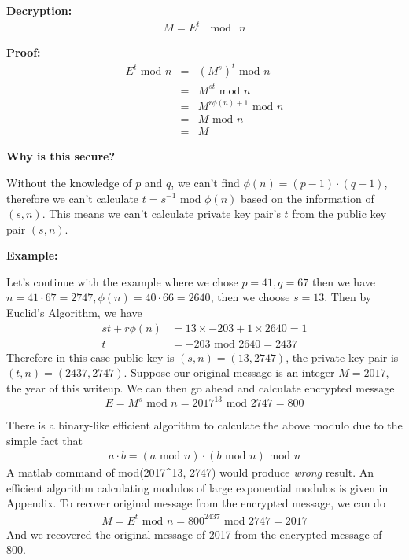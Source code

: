 \documentclass[]{paper}
\begin{document}
\textbf{Decryption:}
\begin{eqnarray*}
M = E^t\ \mod\ n 
\end{eqnarray*}

\textbf{Proof:}
\begin{eqnarray*}
E^t\text{ mod }n &=& (M^s)^t\text{ mod }n \\
&=& M^{s t}\text{ mod }n \\
&=& M^{r\phi(n) + 1}\text{ mod }n \\
&=& M\text{ mod }n \\
&=& M
\end{eqnarray*}

\textbf{Why is this secure?}
\bigskip

Without the knowledge of $p$ and $q$, we can't find $\phi(n)=(p-1)\cdot(q-1)$, therefore we can't calculate $t = s^{-1}\text{ mod }\phi(n)$ based on the information of $(s,n)$. This means we can't calculate private key pair's $t$ from the public key pair $(s,n)$.

\textbf{Example:}

Let's continue with the example where we chose $p = 41, q = 67$ then we have $n = 41\cdot 67= 2747, \phi(n)= 40\cdot 66 = 2640$, then we choose $s = 13$. Then by Euclid's Algorithm, we have 
\begin{align*}
s t + r\phi(n) &= 13\times -203 + 1\times2640 = 1\\
t &= -203\text{ mod } 2640 = 2437
\end{align*}
Therefore in this case public key is $(s,n) = (13,2747)$, the private key pair is $(t,n) = (2437, 2747)$. Suppose our original message is an integer $M = 2017$, the year of this writeup. We can then go ahead and calculate encrypted message
\begin{equation*}
E = M^s\text{ mod }n = 2017^{13}\text{ mod }2747 = 800
\end{equation*}

There is a binary-like efficient algorithm to calculate the above modulo due to the simple fact that
\begin{align*}
    a\cdot b = (a\text{ mod }n)\cdot(b\text{ mod }n)\text{ mod }n
\end{align*}
A matlab command of mod(2017\^{}13, 2747) would produce \textit{wrong} result. An efficient algorithm calculating modulos of large exponential modulos is given in Appendix. To recover original message from the encrypted message, we can do
\begin{eqnarray*}
M = E^t\text{ mod }n = 800^{2437}\text{ mod }2747 = 2017
\end{eqnarray*}
And we recovered the original message of 2017 from the encrypted message of 800.
\newpage
\end{document}
